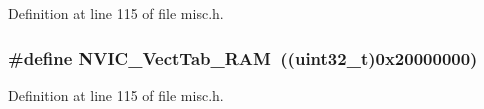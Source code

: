 Definition at line 115 of file misc.\+h.

\subsubsection[{\texorpdfstring{N\+V\+I\+C\+\_\+\+Vect\+Tab\+\_\+\+R\+AM}{NVIC_VectTab_RAM}}]{\setlength{\rightskip}{0pt plus 5cm}\#define N\+V\+I\+C\+\_\+\+Vect\+Tab\+\_\+\+R\+AM~(({\bf uint32\+\_\+t})0x20000000)}\hypertarget{group___vector___table___base_ga8be8181cc3e5d42f6204af306ab50f80}{}\label{group___vector___table___base_ga8be8181cc3e5d42f6204af306ab50f80}


Definition at line 115 of file misc.\+h.

